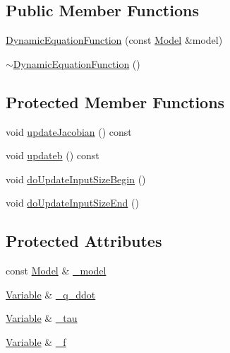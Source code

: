 \subsection*{Public Member Functions}
\begin{DoxyCompactItemize}
\item 
\hyperlink{classocra_1_1DynamicEquationFunction_ab6a38098b1aac7db298e0f3a93955624}{Dynamic\+Equation\+Function} (const \hyperlink{classocra_1_1Model}{Model} \&model)
\item 
\hyperlink{classocra_1_1DynamicEquationFunction_a84c82f21c1564aaca6b5aa703ecae73e}{$\sim$\+Dynamic\+Equation\+Function} ()
\end{DoxyCompactItemize}
\subsection*{Protected Member Functions}
\begin{DoxyCompactItemize}
\item 
void \hyperlink{classocra_1_1DynamicEquationFunction_a74620e3b3dcd26da7daffe2d3bdf4654}{update\+Jacobian} () const 
\item 
void \hyperlink{classocra_1_1DynamicEquationFunction_a42b7f52bbdbcb97c669a6d2600a417d9}{updateb} () const 
\item 
void \hyperlink{classocra_1_1DynamicEquationFunction_a6fc52fcd947fa303e55729dbb286b92c}{do\+Update\+Input\+Size\+Begin} ()
\item 
void \hyperlink{classocra_1_1DynamicEquationFunction_a8d20f6ed1e3983d1fddf648729eba955}{do\+Update\+Input\+Size\+End} ()
\end{DoxyCompactItemize}
\subsection*{Protected Attributes}
\begin{DoxyCompactItemize}
\item 
const \hyperlink{classocra_1_1Model}{Model} \& \hyperlink{classocra_1_1DynamicEquationFunction_ad0c5d639974a97aa3ed3f0bbe0f8189d}{\+\_\+model}
\item 
\hyperlink{classocra_1_1Variable}{Variable} \& \hyperlink{classocra_1_1DynamicEquationFunction_a8a6dfb64fcca3c42a9e7ad637706a6cc}{\+\_\+q\+\_\+ddot}
\item 
\hyperlink{classocra_1_1Variable}{Variable} \& \hyperlink{classocra_1_1DynamicEquationFunction_a60ba636a9028046969c5491ec7ed2f9e}{\+\_\+tau}
\item 
\hyperlink{classocra_1_1Variable}{Variable} \& \hyperlink{classocra_1_1DynamicEquationFunction_a70499af5c86e68836acb7251b37ab668}{\+\_\+f}
\end{DoxyCompactItemize}
